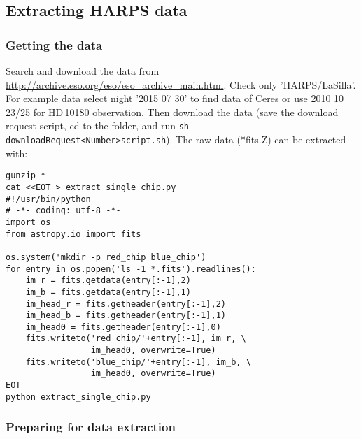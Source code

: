 \documentclass[10pt,a4paper]{article}
\begin{document}
\subsection{Extracting HARPS data}

\subsubsection{Getting the data}
Search and download the data from \url{http://archive.eso.org/eso/eso_archive_main.html}. Check only 'HARPS/LaSilla'. For example data select night '2015 07 30' to find data of Ceres or use 2010 10 23/25 for HD\,10180 observation. Then download the data (save the download request script, cd to the folder, and run \verb|sh  downloadRequest<Number>script.sh|). The raw data (*fits.Z) can be extracted with:
\begin{lstlisting}[style=base]
gunzip *
cat <<EOT > extract_single_chip.py
#!/usr/bin/python
# -*- coding: utf-8 -*-
import os
from astropy.io import fits

os.system('mkdir -p red_chip blue_chip')
for entry in os.popen('ls -1 *.fits').readlines():
    im_r = fits.getdata(entry[:-1],2)
    im_b = fits.getdata(entry[:-1],1)
    im_head_r = fits.getheader(entry[:-1],2)
    im_head_b = fits.getheader(entry[:-1],1)
    im_head0 = fits.getheader(entry[:-1],0)
    fits.writeto('red_chip/'+entry[:-1], im_r, \
                 im_head0, overwrite=True)
    fits.writeto('blue_chip/'+entry[:-1], im_b, \
                 im_head0, overwrite=True)
EOT
python extract_single_chip.py
\end{lstlisting}


\subsubsection{Preparing for data extraction}
\end{document}

